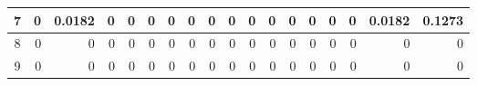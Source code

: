 \begin{table}[ht]
\begin{adjustbox}{width = \textwidth, center}
\begin{tabular}{|c|r|r|r|r|r|r|r|r|r|r|r|r|r|r|r|r|r|}
            \rowcolor[HTML]{FFFFFF} 
            \cellcolor[HTML]{CFE2F3}7                            & 0                                              & \cellcolor[HTML]{C7E9D8}0.0182                 & 0                                              & 0                                              & 0                                              & 0                                              & 0                                              & 0                                               & 0                                               & 0                                               & 0                                               & 0                                               & 0                                               & 0                                               & 0                                               & \cellcolor[HTML]{D9D2E9}0.0182                                                        & \cellcolor[HTML]{D9D2E9}0.1273                                                            \\ \hline
            \rowcolor[HTML]{FFFFFF} 
            \cellcolor[HTML]{CFE2F3}8                            & 0                                              & 0                                              & 0                                              & 0                                              & 0                                              & 0                                              & 0                                              & 0                                               & 0                                               & 0                                               & 0                                               & 0                                               & 0                                               & 0                                               & 0                                               & \cellcolor[HTML]{D9D2E9}0                                                             & \cellcolor[HTML]{D9D2E9}0                                                                 \\ \hline
            \rowcolor[HTML]{FFFFFF} 
            \cellcolor[HTML]{CFE2F3}9                            & 0                                              & 0                                              & 0                                              & 0                                              & 0                                              & 0                                              & 0                                              & 0                                               & 0                                               & 0                                               & 0                                               & 0                                               & 0                                               & 0                                               & 0                                               & \cellcolor[HTML]{D9D2E9}0                                                             & \cellcolor[HTML]{D9D2E9}0                                                                 \\ \hline

\end{tabular}
\end{adjustbox}
\end{table}
